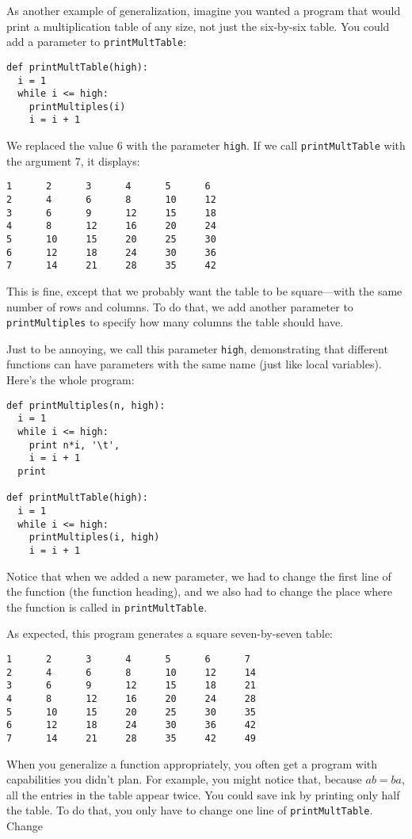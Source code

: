 As another example of generalization, imagine you wanted a program
that would print a multiplication table of any size, not just the
six-by-six table. You could add a parameter to {\tt printMultTable}:

\beforeverb
\begin{verbatim}
def printMultTable(high):
  i = 1
  while i <= high:
    printMultiples(i)
    i = i + 1
\end{verbatim}
\afterverb
%
We replaced the value 6 with the parameter {\tt high}.  If we call
{\tt printMultTable} with the argument 7, it displays:

\beforeverb
\begin{verbatim}
1      2      3      4      5      6
2      4      6      8      10     12
3      6      9      12     15     18
4      8      12     16     20     24
5      10     15     20     25     30
6      12     18     24     30     36
7      14     21     28     35     42
\end{verbatim}
\afterverb
%
This is fine, except that we probably want the table to be
square---with the same number of rows and columns.  To do that, we
add another parameter to {\tt printMultiples} to specify how many
columns the table should have.

Just to be annoying, we call this parameter {\tt high}, demonstrating
that different functions can have parameters with the same name (just like
local variables).  Here's the whole program:

\beforeverb
\begin{verbatim}
def printMultiples(n, high):
  i = 1
  while i <= high:
    print n*i, '\t',
    i = i + 1
  print

def printMultTable(high):
  i = 1
  while i <= high:
    printMultiples(i, high)
    i = i + 1
\end{verbatim}
\afterverb
%
Notice that when we added a new parameter, we had to change the first line
of the function (the function heading), and we also had to change the place
where the function is called in {\tt printMultTable}.

As expected, this program generates a square seven-by-seven table:

\beforeverb
\begin{verbatim}
1      2      3      4      5      6      7
2      4      6      8      10     12     14
3      6      9      12     15     18     21
4      8      12     16     20     24     28
5      10     15     20     25     30     35
6      12     18     24     30     36     42
7      14     21     28     35     42     49
\end{verbatim}
\afterverb
%
When you generalize a function appropriately, you often get
a program with capabilities you didn't plan.  For
example, you might
notice that, because $ab = ba$,
all the entries in the table appear twice.  You could save ink by printing
only half the table.  To do that, you only have to change one line of
{\tt printMultTable}.  Change

